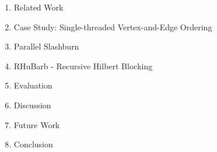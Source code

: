 \begin{enumerate}
    \item{Related Work}
    
    \item{Case Study: Single-threaded Vertex-and-Edge Ordering}
    
    \item{Parallel Slashburn}
    \item{RHuBarb - Recursive Hilbert Blocking}
    \item{Evaluation}
    \item{Discussion}
    \item{Future Work}
    \item{Conclusion}


    
        
\end{enumerate}

